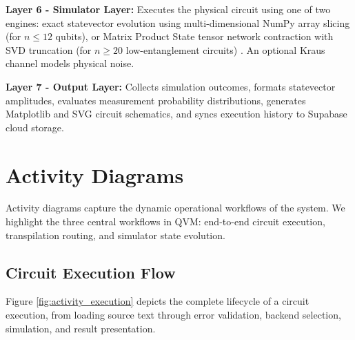\textbf{Layer 6 - Simulator Layer:} Executes the physical circuit using one of two engines: exact statevector evolution using multi-dimensional NumPy array slicing (for $n \le 12$ qubits), or Matrix Product State tensor network contraction with SVD truncation (for $n \ge 20$ low-entanglement circuits) \cite{vidal2003mps}. An optional Kraus channel models physical noise.

\textbf{Layer 7 - Output Layer:} Collects simulation outcomes, formats statevector amplitudes, evaluates measurement probability distributions, generates Matplotlib and SVG circuit schematics, and syncs execution history to Supabase cloud storage.

\section{Activity Diagrams}
Activity diagrams capture the dynamic operational workflows of the system. We highlight the three central workflows in QVM: end-to-end circuit execution, transpilation routing, and simulator state evolution.

\subsection{Circuit Execution Flow}
Figure \ref{fig:activity_execution} depicts the complete lifecycle of a circuit execution, from loading source text through error validation, backend selection, simulation, and result presentation.

